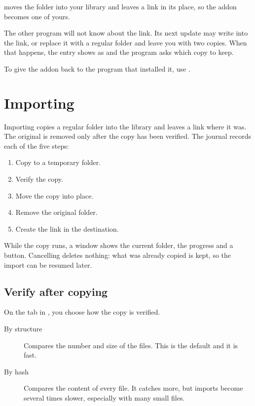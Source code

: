 \documentclass[11pt,a4paper]{article}
\begin{document}
 moves the folder into your library and leaves a link in
its place, so the addon becomes one of yours.

The other program will not know about the link. Its next update may write into
the link, or replace it with a regular folder and leave you with two copies.
When that happens, the entry shows as  and the program asks which
copy to keep.

To give the addon back to the program that installed it, use .

\section{Importing}

Importing copies a regular folder into the library and leaves a link where it
was. The original is removed only after the copy has been verified. The journal
records each of the five steps:


\begin{enumerate}
  \item Copy to a temporary folder.
  \item Verify the copy.
  \item Move the copy into place.
  \item Remove the original folder.
  \item Create the link in the destination.
\end{enumerate}

While the copy runs, a window shows the current folder, the progress and a
 button. Cancelling deletes nothing: what was already copied is kept,
so the import can be resumed later.

\subsection{Verify after copying}

On the  tab in , you choose how the copy is verified.

\begin{description}
  \item[By structure] Compares the number and size of the files. This is the
    default and it is fast.
  \item[By hash] Compares the content of every file. It catches more, but
    imports become several times slower, especially with many small files.
\end{description}
\end{document}

